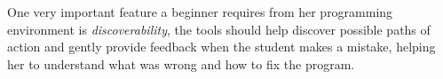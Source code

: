One very important feature a beginner requires from her programming environment is \emph{discoverability}, 
\ie the tools should help discover possible paths of action and gently provide feedback when the student makes a mistake, 
helping her to understand what was wrong and how to fix the program.



